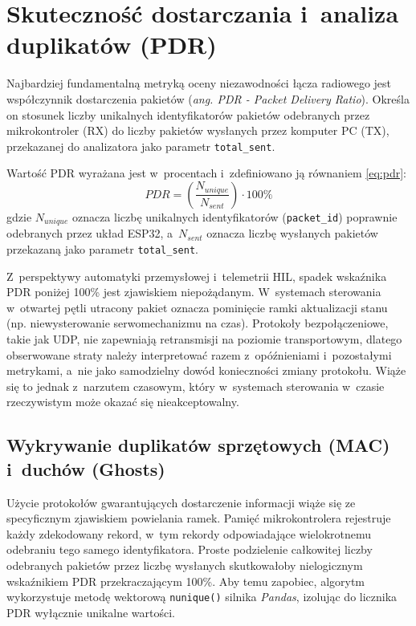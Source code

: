 \section{Skuteczność dostarczania i~analiza duplikatów (PDR)}
\label{sec:pdr}

Najbardziej fundamentalną metryką oceny niezawodności łącza radiowego jest współczynnik dostarczenia pakietów (\textit{ang. PDR - Packet Delivery Ratio}).
Określa on stosunek liczby unikalnych identyfikatorów pakietów odebranych przez mikrokontroler (RX) do liczby pakietów wysłanych przez komputer PC (TX), przekazanej do analizatora jako parametr \texttt{total\_sent}.

Wartość PDR wyrażana jest w~procentach i~zdefiniowano ją równaniem \ref{eq:pdr}:
\begin{equation}
    PDR = \left( \frac{N_{unique}}{N_{sent}} \right) \cdot 100\% \label{eq:pdr} \end{equation} gdzie $N_{unique}$ oznacza liczbę unikalnych identyfikatorów (\texttt{packet\_id}) poprawnie odebranych przez układ ESP32, a~$N_{sent}$ oznacza liczbę wysłanych pakietów przekazaną jako parametr \texttt{total\_sent}.

Z~perspektywy automatyki przemysłowej i~telemetrii HIL, spadek wskaźnika PDR poniżej 100\% jest zjawiskiem niepożądanym.
W~systemach sterowania w~otwartej pętli utracony pakiet oznacza pominięcie ramki aktualizacji stanu (np. niewysterowanie serwomechanizmu na czas).
Protokoły bezpołączeniowe, takie jak UDP, nie zapewniają retransmisji na poziomie transportowym, dlatego obserwowane straty należy interpretować razem z~opóźnieniami i~pozostałymi metrykami, a~nie jako samodzielny dowód konieczności zmiany protokołu.
Wiąże się to jednak z~narzutem czasowym, który w~systemach sterowania w~czasie rzeczywistym może okazać się nieakceptowalny.

\subsection{Wykrywanie duplikatów sprzętowych (MAC) i~duchów (Ghosts)}

Użycie protokołów gwarantujących dostarczenie informacji wiąże się ze specyficznym zjawiskiem powielania ramek.
Pamięć mikrokontrolera rejestruje każdy zdekodowany rekord, w~tym rekordy odpowiadające wielokrotnemu odebraniu tego samego identyfikatora.
Proste podzielenie całkowitej liczby odebranych pakietów przez liczbę wysłanych skutkowałoby nielogicznym wskaźnikiem PDR przekraczającym 100\%.
Aby temu zapobiec, algorytm wykorzystuje metodę wektorową \texttt{nunique()} silnika \textit{Pandas}, izolując do licznika PDR wyłącznie unikalne wartości.

